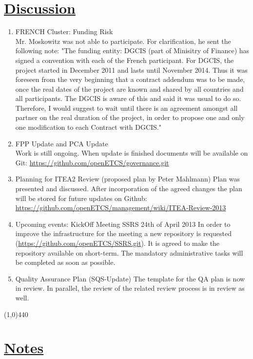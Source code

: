 \documentclass[a4paper]{article}
\begin{document}
\section*{\underline{Discussion}}
\begin{enumerate}
\item FRENCH Cluster: Funding Risk\\
Mr. Moskowitz was not able to participate. For clarification, he sent the following note: "The funding entity: DGCIS (part of Minisitry of Finance) has signed a convention with each of the French participant. For DGCIS, the project started in December 2011 and lasts until November 2014. Thus it was foreseen from the very beginning that a contract addendum was to be made, once the real dates of the project are known and shared by all countries and all participants. The DGCIS is aware of this and said it was usual to do so.\\
Therefore, I would suggest to wait until there is an agreement amongst all partner on the real duration of the project, in order to propose one and only one modification to each Contract with DGCIS."
\item FPP Update and PCA Update\\
Work is still ongoing. When update is finished documents will be available on Git: \url{https://github.com/openETCS/governance.git}
\item Planning for ITEA2 Review (proposed plan by Peter Mahlmann)
Plan was presented and discussed. After incorporation of the agreed changes the plan will be stored for future updates on Github: \url{https://github.com/openETCS/management/wiki/ITEA-Review-2013}
\item Upcoming events: KickOff Meeting SSRS 24th of April 2013
In order to improve the infrastructure for the meeting a new repository is requested (\url{https://github.com/openETCS/SSRS.git}). It is agreed to make the repository available on short-term. The mandatory administrative tasks will be completed as soon as possible.
\item Quality Assurance Plan (SQS-Update)
The template for the QA plan is now in review. In parallel, the review of the related review process is in review as well.
\end{enumerate}

\line(1,0){440}
\section*{\underline{Notes}}
\end{document}
